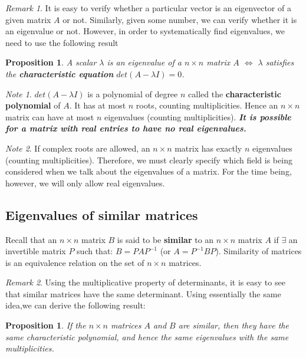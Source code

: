 \documentclass[]{extarticle}
\theoremstyle{Simple}
\newtheorem{prop}[thm]{Proposition}
\theoremstyle{definition}
\theoremstyle{remark}
\newtheorem*{rem}{Remark}
\newtheorem*{note}{Note}
\theoremstyle{example}
\begin{document}
\begin{rem}
It is easy to verify whether a particular vector is an eigenvector of a given matrix $A$ or not. Similarly, given some number, we can verify whether it is an eigenvalue or not.
However, in order to systematically find eigenvalues, we need to use the following result
\end{rem}

\begin{prop}
A scalar $\lambda$ is an eigenvalue of a $n \times n$ matrix $A$ $\iff$ $\lambda$ satisfies the \textbf{characteristic equation} $det(A - \lambda I) = 0$.
\end{prop}

\begin{note}
$det(A - \lambda I)$ is a polynomial of degree $n$ called the \textbf{characteristic polynomial} of $A$. It has at most $n$ roots, counting multiplicities. Hence an $n \times n$ matrix can have at most $n$ eigenvalues (counting multiplicities). \textbf{\textit{It is possible for a matrix with real entries to have no real eigenvalues.}}
\end{note}

\begin{note}
If complex roots are allowed, an $n \times n$ matrix has exactly $n$ eigenvalues (counting multiplicities). Therefore, we must clearly specify which field is being considered when we talk about the eigenvalues of a matrix. For the time being, however, we will only allow real eigenvalues.
\end{note}

\subsection{Eigenvalues of similar matrices}

Recall that an $n \times n$ matrix $B$ is said to be \textbf{similar} to an $n \times n$ matrix $A$ if $\exists$ an invertible matrix $P$ such that:
$B = PAP^{-1}$ (or $A = P^{-1}BP$).
Similarity of matrices is an equivalence relation on the set of $n \times n$ matrices.

\begin{rem}
Using the multiplicative property of
determinants, it is easy to see that similar matrices have
the same determinant. Using essentially the same idea,we
can derive the following result:
\end{rem}

\begin{prop}
If the $n \times n$ matrices $A$ and $B$ are similar, then they have the same characteristic polynomial, and hence the same eigenvalues with the same multiplicities.
\end{prop}
\end{document}
